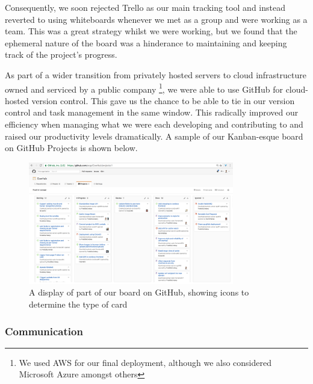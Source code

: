 Consequently, we soon rejected Trello as our main tracking tool and instead reverted to using whiteboards whenever we met as a group and were working as a team. This was a great strategy whilst we were working, but we found that the ephemeral nature of the board was a hinderance to maintaining and keeping track of the project's progress.

As part of a wider transition from privately hosted servers to cloud infrastructure owned and serviced by a public company \footnote{We used AWS for our final deployment, although we also considered Microsoft Azure amongst others}, we were able to use GitHub for cloud-hosted version control. This gave us the chance to be able to tie in our version control and task management in the same window. This radically improved our efficiency when managing what we were each developing and contributing to and raised our productivity levels dramatically. A sample of our Kanban-esque board on GitHub Projects is shown below.

\begin{figure}[H]
	\centering
	\includegraphics[width=0.8\textwidth]{images/github-project}
	\caption[CowHub's 'Kanban' board on GitHub using GitHub Projects]{
		A display of part of our board on GitHub, showing icons to determine the type of card
	}
\end{figure}


\subsubsection{Communication}







